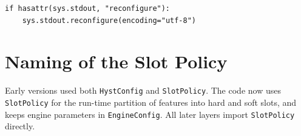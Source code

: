 \documentclass[12pt,a4paper,oneside]{report}
\newcommand{\code}[1]{\texttt{\small #1}}
\begin{document}
\begin{lstlisting}
if hasattr(sys.stdout, "reconfigure"):
    sys.stdout.reconfigure(encoding="utf-8")
\end{lstlisting}

\section{Naming of the Slot Policy}
Early versions used both \code{HystConfig} and \code{SlotPolicy}. The code now uses \code{SlotPolicy} for the run-time partition of features into hard and soft slots, and keeps engine parameters in \code{EngineConfig}. All later layers import \code{SlotPolicy} directly.
\end{document}
